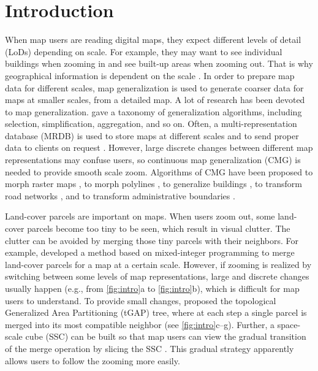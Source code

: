 \documentclass[ijgi,article,submit,moreauthors,pdftex]{Definitions/mdpi}
\begin{document}



\section{Introduction}

When map users are reading digital maps,
they expect different levels of detail (LoDs) depending on scale.
For example, they may want to see individual buildings when zooming in
and see built-up areas when zooming out.
That is why geographical information is dependent on the scale
\citep{Muller1995Generalization,Weibel1997}. 
In order to prepare map data for different scales,
map generalization is used to generate coarser data 
for maps at smaller scales,
from a detailed map.
A lot of research has been devoted to map generalization.
\citet{Mackaness2017Generalization} gave a taxonomy of 
generalization algorithms, 
including selection, simplification, aggregation, and so on.
Often, a multi-representation database (MRDB) is used to store
maps at different scales and to send proper data to clients on request
\citep[\eg][]{Hampe2004multiple}.
However, large discrete changes between different map representations
may confuse users,
so continuous map generalization (CMG) is needed to
provide smooth scale zoom.
Algorithms of CMG have been proposed 
to morph raster maps
\citep[\eg][]{Pantazis2009a,Pantazis2009b}, 
to morph polylines
\citep[\eg][]{Noellenburg2008,Peng2013LSA,Deng2015,Li2017Annealing},
to generalize buildings
\citep[\eg][]{Li2017_Building,Peng2017Building,Touya2017Progressive},
to transform road networks
\citep[\eg][]{Suba2016Road,Chimani2014Eat},
and to transform administrative boundaries
\citep[\eg][]{Peng2016Admin}.


Land-cover parcels are important on maps. 
When users zoom out,
some land-cover parcels become too tiny to be seen,
which result in visual clutter.
The clutter can be avoided by merging those tiny parcels 
with their neighbors.
For example, \citet{haunert2008f} developed a method based on
mixed-integer programming to merge land-cover parcels
for a map at a certain scale.
However, if zooming is realized by switching between
some levels of map representations, 
large and discrete changes usually happen
(e.g., from \fig\ref{fig:intro}a to \fig\ref{fig:intro}b), 
which is difficult for map users to understand.
To provide small changes, 
\citet{vanOosterom2005} proposed 
the topological Generalized Area Partitioning (tGAP) tree,
where at each step a single parcel is merged into
its most compatible neighbor 
(see \fig\ref{fig:intro}c--g).
Further, a space-scale cube (SSC) can be built so that 
map users can view the gradual transition of the merge operation
by slicing the SSC \citep[see][]{Meijers2020Web}.
This gradual strategy apparently allows users 
to follow the zooming more easily.
\end{document}
